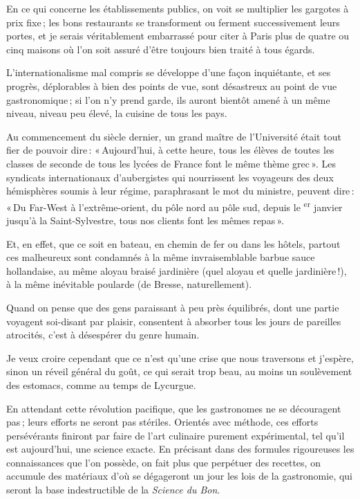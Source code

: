 En ce qui concerne les établissements publics, on voit se multiplier les gargotes
à prix fixe ; les bons restaurants se transforment ou ferment successivement leurs
portes, et je serais véritablement embarrassé pour citer à Paris plus de quatre ou
cinq maisons où l'on soit assuré d'être toujours bien traité à tous égards.

L'internationalisme mal compris se développe d'une façon inquiétante, et ses
progrès, déplorables à bien des points de vue, sont désastreux au point de vue
gastronomique ; si l'on n'y prend garde, ils auront bientôt amené à un même
niveau, niveau peu élevé, la cuisine de tous les pays.

Au commencement du siècle dernier, un grand maître de l'Université était tout
fier de pouvoir dire : « Aujourd'hui, à cette heure, tous les élèves de toutes
les classes de seconde de tous les lycées de France font le même thème grec ».
Les syndicats internationaux d'aubergistes qui nourrissent les voyageurs des
deux hémisphères soumis à leur régime, paraphrasant le mot du ministre, peuvent
dire : « Du Far-West à l'extrême-orient, du pôle nord au pôle sud, depuis le
{\mmm}\textsuperscript{er} janvier jusqu'à la Saint-Sylvestre, tous nos
clients font les mêmes repas ».

Et, en effet, que ce soit en bateau, en chemin de fer ou dans les hôtels,
partout ces malheureux sont condamnés à la même invraisemblable barbue sauce
hollandaise, au même aloyau braisé jardinière (quel aloyau et quelle
jardinière !), à la même inévitable poularde (de Bresse, naturellement).

Quand on pense que des gens paraissant à peu près équilibrés, dont une partie
voyagent soi-disant par plaisir, consentent à absorber tous les jours de
pareilles atrocités, c'est à désespérer du genre humain.

Je veux croire cependant que ce n'est qu'une crise que nous traversons et
j'espère, sinon un réveil général du goût, ce qui serait trop beau, au moins un
soulèvement des estomacs, comme au temps de Lycurgue.

En attendant cette révolution pacifique, que les gastronomes ne se découragent
pas ; leurs efforts ne seront pas stériles. Orientés avec méthode, ces efforts
persévérants finiront par faire de l'art culinaire purement expérimental, tel
qu'il est aujourd'hui, une science exacte. En précisant dans des formules
rigoureuses les connaissances que l’on possède, on fait plus que perpétuer des
recettes, on accumule des matériaux d'où se dégageront un jour les lois de la
gastronomie, qui seront la base indestructible de la \textit{Science du Bon}.
